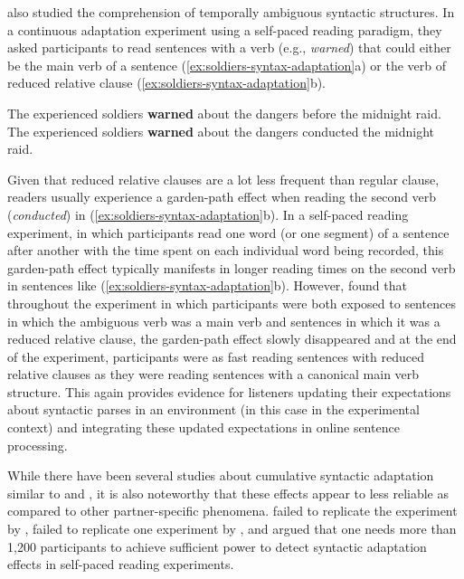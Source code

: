 \cite{FineJaeger2013} also studied the comprehension of temporally ambiguous syntactic structures. In a continuous adaptation experiment using a self-paced reading paradigm,
they asked participants to read sentences with a verb (e.g., \textit{warned}) that could either be the main verb of a sentence (\ref{ex:soldiers-syntax-adaptation}a) or the verb of reduced relative clause (\ref{ex:soldiers-syntax-adaptation}b).
\begin{exe}
\ex \begin{xlist} \label{ex:soldiers-syntax-adaptation}
\ex The experienced soldiers \textbf{warned} about the dangers before the midnight raid.
\ex The experienced soldiers \textbf{warned} about the dangers conducted the midnight raid.
\end{xlist}
\end{exe}
\noindent Given that reduced relative clauses are a lot less frequent than regular clause, readers usually experience a garden-path effect 
when reading the second verb (\textit{conducted}) in (\ref{ex:soldiers-syntax-adaptation}b). In a self-paced reading experiment, in which 
participants read one word (or one segment) of a sentence after another with the time spent on each individual word being recorded,
this garden-path effect typically manifests in longer reading times on the second verb in sentences like (\ref{ex:soldiers-syntax-adaptation}b).
However, \cite{FineJaeger2013} found that throughout the experiment in which participants were both exposed to sentences in which the ambiguous verb
was a main verb and sentences in which it was a reduced relative clause, the garden-path effect slowly disappeared and at the end of the experiment,
participants were as fast reading sentences with reduced relative clauses as they were reading sentences with a canonical main verb structure.
This again provides evidence for listeners updating their expectations about syntactic parses in an environment (in this case in the experimental context)
and integrating these updated expectations in online sentence processing.

While there have been several studies about cumulative syntactic adaptation similar to \cite{Kamide2012} and \cite{FineJaeger2013}, it is also noteworthy
that these effects appear to less reliable as compared to other partner-specific phenomena. \cite{Liu2017} failed to replicate the experiment by \cite{Kamide2012}, 
\cite{HarringtonStack2018} failed to replicate one experiment by  \cite{FineJaeger2013}, and \cite{PrasadLinzen2020} argued that one needs more than 1,200
participants to achieve sufficient power to detect syntactic adaptation effects in self-paced reading experiments.

